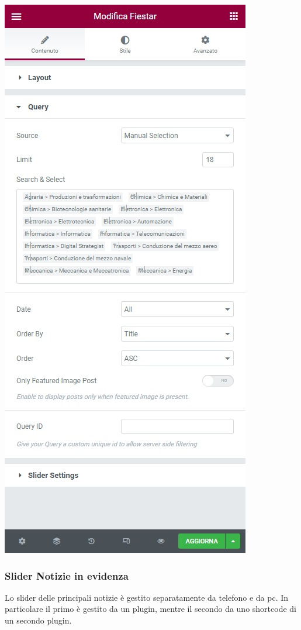 \documentclass{article}
\begin{document}
		\vspace{0.2 cm}
		\begin{center}
			\includegraphics[scale=0.28]{Modifica Slider Indirizzi.jpeg}\\
		\end{center}
	\subsubsection{\textbf{Slider Notizie in evidenza}}
	Lo slider delle principali notizie è gestito separatamente da telefono e da pc.
	In particolare il primo è gestito da un plugin, mentre il secondo da uno shortcode di un secondo plugin.
	
\end{document}
